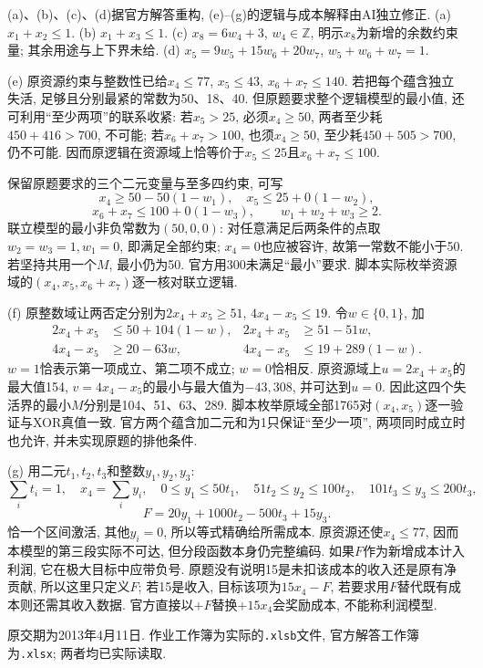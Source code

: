 \begin{solution}
(a)、(b)、(c)、(d)据官方解答重构, (e)--(g)的逻辑与成本解释由AI独立修正. (a) $x_1+x_2\le1$. (b) $x_1+x_3\le1$. (c) $x_8=6w_4+3$, $w_4\in\mathbb Z$, 明示$x_8$为新增的余数约束量; 其余用途与上下界未给. (d) $x_5=9w_5+15w_6+20w_7$, $w_5+w_6+w_7=1$.

(e) 原资源约束与整数性已给$x_4\le77$, $x_5\le43$, $x_6+x_7\le140$. 若把每个蕴含独立失活, 足够且分别最紧的常数为50、18、40. 但原题要求整个逻辑模型的最小值, 还可利用“至少两项”的联系收紧: 若$x_5>25$, 必须$x_4\ge50$, 两者至少耗$450+416>700$, 不可能; 若$x_6+x_7>100$, 也须$x_4\ge50$, 至少耗$450+505>700$, 仍不可能. 因而原逻辑在资源域上恰等价于$x_5\le25$且$x_6+x_7\le100$.

保留原题要求的三个二元变量与至多四约束, 可写
\[
x_4\ge50-50(1-w_1),\quad x_5\le25+0(1-w_2),
\]
\[
x_6+x_7\le100+0(1-w_3),\qquad w_1+w_2+w_3\ge2.
\]
联立模型的最小非负常数为$(50,0,0)$: 对任意满足后两条件的点取$w_2=w_3=1,w_1=0$, 即满足全部约束; $x_4=0$也应被容许, 故第一常数不能小于50. 若坚持共用一个$M$, 最小仍为50. 官方用300未满足“最小”要求. 脚本实际枚举资源域的$(x_4,x_5,x_6+x_7)$逐一核对联立逻辑.

(f) 原整数域让两否定分别为$2x_4+x_5\ge51$, $4x_4-x_5\le19$. 令$w\in\{0,1\}$, 加
\begin{align*}
2x_4+x_5&\le50+104(1-w),&2x_4+x_5&\ge51-51w,\\
4x_4-x_5&\ge20-63w,&4x_4-x_5&\le19+289(1-w).
\end{align*}
$w=1$恰表示第一项成立、第二项不成立; $w=0$恰相反. 原资源域上$u=2x_4+x_5$的最大值154, $v=4x_4-x_5$的最小与最大值为$-43,308$, 并可达到$u=0$. 因此这四个失活界的最小$M$分别是104、51、63、289. 脚本枚举原域全部1765对$(x_4,x_5)$逐一验证与XOR真值一致. 官方两个蕴含加二元和为1只保证“至少一项”, 两项同时成立时也允许, 并未实现原题的排他条件.

(g) 用二元$t_1,t_2,t_3$和整数$y_1,y_2,y_3$:
\[
\sum_it_i=1,\quad x_4=\sum_i y_i,\quad
0\le y_1\le50t_1,\quad51t_2\le y_2\le100t_2,\quad101t_3\le y_3\le200t_3,
\]
\[
F=20y_1+1000t_2-500t_3+15y_3.
\]
恰一个区间激活, 其他$y_i=0$, 所以等式精确给所需成本. 原资源还使$x_4\le77$, 因而本模型的第三段实际不可达, 但分段函数本身仍完整编码. 如果$F$作为新增成本计入利润, 它在极大目标中应带负号. 原题没有说明15是未扣该成本的收入还是原有净贡献, 所以这里只定义$F$; 若15是收入, 目标该项为$15x_4-F$, 若要求用$F$替代既有成本则还需其收入数据. 官方直接以$+F$替换$+15x_4$会奖励成本, 不能称利润模型.
\end{solution}

原交期为2013年4月11日. 作业工作簿为实际的\texttt{.xlsb}文件, 官方解答工作簿为\texttt{.xlsx}; 两者均已实际读取.

